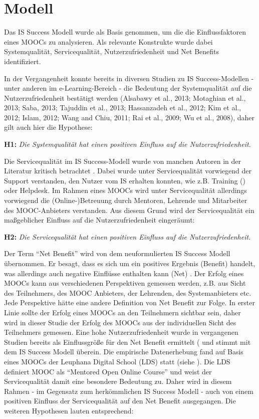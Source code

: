 \section{Modell}
\label{sec:modell}
Das IS Success Modell wurde als Basis genommen, um die die Einflussfaktoren eines MOOCs zu analysieren. Als relevante Konstrukte wurde dabei Systemqualität, Servicequalität, Nutzerzufriedenheit und Net Benefits identifiziert.  

In der Vergangenheit konnte bereits in diversen Studien zu IS Success-Modellen - unter anderen im e-Learning-Bereich - die Bedeutung der Systemqualität auf die Nutzerzufriedenheit bestätigt werden (Alsabawy et al., 2013; Motaghian et al., 2013; Saba, 2013; Tajuddin et al., 2013; Hassanzadeh et al., 2012; Kim et al., 2012; Islam, 2012; Wang and Chiu, 2011; Rai et al., 2009; Wu et al., 2008), daher gilt auch hier die Hypothese: 
  
\textbf{H1:} \textit{Die Systemqualität hat einen positiven Einfluss auf die Nutzerzufriedenheit.}

Die Servicequalität im IS Success-Modell wurde von manchen Autoren in der Literatur kritisch betrachtet . Dabei wurde unter Servicequalität vorwiegend der Support verstanden, den Nutzer vom IS erhalten konnten, wie z.B. Training (\parencite{petter2009meta}) oder Helpdesk. Im Rahmen eines MOOCs wird unter Servicequalität allerdings vorwiegend die (Online-)Betreuung durch Mentoren, Lehrende und Mitarbeiter des MOOC-Anbieters verstanden. Aus diesem Grund wird der Servicequalität ein maßgeblicher Einfluss auf die Nutzerzufriedenheit eingeräumt: 

\textbf{H2:} \textit{Die Servicequalität hat einen positiven Einfluss auf die Nutzerzufriedenheit.}	

Der Term "`Net Benefit"' wird von dem neuformulierten IS Success Modell übernommen. Er besagt, dass es sich um ein positives Ergebnis (Benefit) handelt, was allerdings auch negative Einflüsse enthalten kann (Net) \parencite[vgl.][S.2974]{delone2002information}. Der Erfolg eines MOOCs kann aus verschiedenen Perspektiven gemessen werden, z.B. aus Sicht des Teilnehmers, des MOOC Anbieters, der Lehrenden, des Systemanbieters etc. Jede Perspektive hätte eine andere Definition von Net Benefit zur Folge. In erster Linie sollte der Erfolg eines MOOCs an den Teilnehmern sichtbar sein, daher wird in dieser Studie der Erfolg des MOOCs aus der individuellen Sicht des Teilnehmers gemessen. Eine hohe Nutzerzufriedenheit wurde in vergangenen Studien bereits als Einflussgröße für den Net Benefit ermittelt ( und stimmt mit dem IS Success Modell überein. Die empirische Datenerhebung fand auf Basis eines MOOCs der Leuphana Digital School (LDS) statt (siehe ). Die LDS definiert MOOC als "`Mentored Open Online Course"' und weist der Servicequalität damit eine besondere Bedeutung zu. Daher wird in diesem Rahmen - im Gegensatz zum herkömmlichen IS Success Modell - auch von einem positiven Einfluss der Servicequalität auf den Net Benefit ausgegangen. Die weiteren Hypothesen lauten entsprechend: 

